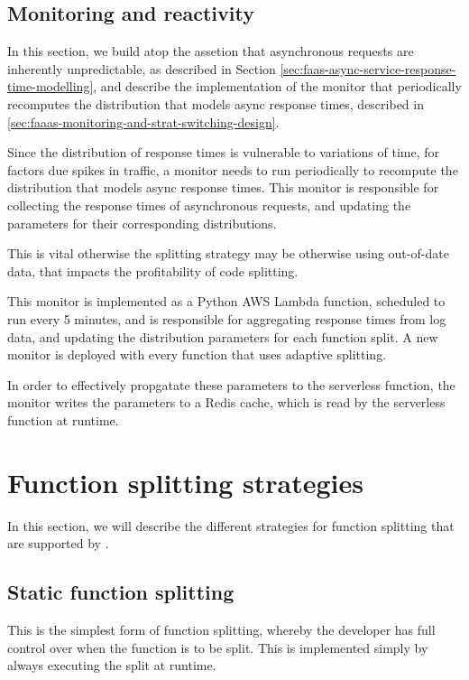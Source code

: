 \subsection{Monitoring and reactivity}
In this section, we build atop the assetion that asynchronous requests are inherently unpredictable, as described in Section \ref{sec:faas-async-service-response-time-modelling}, and describe the implementation of the monitor that periodically recomputes the distribution that models async response times, described in \ref{sec:faaas-monitoring-and-strat-switching-design}.

Since the distribution of response times is vulnerable to variations of time, for factors due spikes in traffic, a monitor needs to run periodically to recompute the distribution that models async response times. This monitor is responsible for collecting the response times of asynchronous requests, and updating the parameters for their corresponding distributions.

This is vital otherwise the splitting strategy may be otherwise using out-of-date data, that impacts the profitability of code splitting.

This monitor is implemented as a Python AWS Lambda function, scheduled to run every 5 minutes, and is responsible for aggregating response times from log data, and updating the distribution parameters for each function split. A new monitor is deployed with every function that uses adaptive splitting.

In order to effectively propgatate these parameters to the serverless function, the monitor writes the parameters to a Redis cache, which is read by the serverless function at runtime.

\section{Function splitting strategies}
\label{sec:faas-function-splitting-strategies}
In this section, we will describe the different strategies for function splitting that are supported by \faaas{}.

\subsection{Static function splitting}
This is the simplest form of function splitting, whereby the developer has full control over when the function is to be split. This is implemented simply by always executing the split at runtime.

